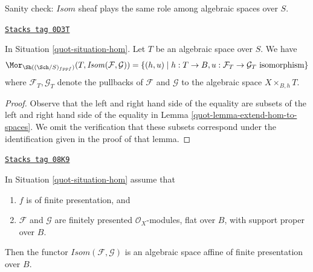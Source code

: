 Sanity check: $\mathit{Isom}$ sheaf plays the same role among algebraic spaces
over $S$.

\begin{lemma}
\label{quot-lemma-extend-isom-to-spaces}
\href{https://stacks.math.columbia.edu/tag/0D3T}{\texttt{Stacks tag 0D3T}}

In Situation \ref{quot-situation-hom}. Let $T$ be an algebraic space over $S$.
We have
$$
\Mor_{\Sh((\Sch/S)_{fppf})}(T, \mathit{Isom}(\mathcal{F}, \mathcal{G})) =
\{(h, u) \mid
h : T \to B, u : \mathcal{F}_T \to \mathcal{G}_T\text{ isomorphism}\}
$$
where $\mathcal{F}_T, \mathcal{G}_T$ denote the pullbacks of $\mathcal{F}$
and $\mathcal{G}$ to the algebraic space $X \times_{B, h} T$.
\end{lemma}

\begin{proof}

Observe that the left and right hand side of the equality are
subsets of the left and right hand side of the equality in
Lemma \ref{quot-lemma-extend-hom-to-spaces}.
We omit the verification that these subsets correspond under
the identification given in the proof of that lemma.
\end{proof}

\begin{proposition}[Isom]
\label{quot-proposition-isom}
\href{https://stacks.math.columbia.edu/tag/08K9}{\texttt{Stacks tag 08K9}}

In Situation \ref{quot-situation-hom} assume that
\begin{enumerate}
\item $f$ is of finite presentation, and
\item $\mathcal{F}$ and $\mathcal{G}$ are finitely presented
$\mathcal{O}_X$-modules, flat over $B$, with support proper over $B$.
\end{enumerate}
Then the functor $\mathit{Isom}(\mathcal{F}, \mathcal{G})$ is
an algebraic space affine of finite presentation over $B$.
\end{proposition}

